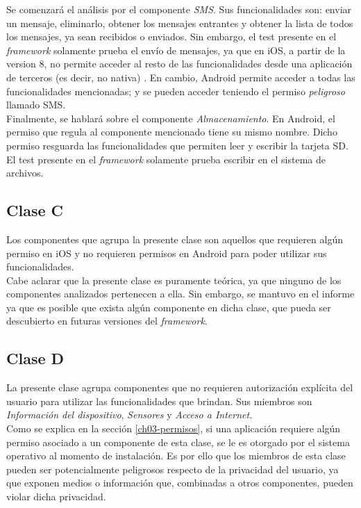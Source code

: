 Se comenzará el análisis por el componente \emph{SMS}. Sus funcionalidades son: enviar un mensaje, eliminarlo, obtener los mensajes entrantes y obtener la lista de todos los mensajes, ya sean recibidos o enviados. Sin embargo, el test presente en el \textit{framework} solamente prueba el envío de mensajes, ya que en iOS, a partir de la version 8, no permite acceder al resto de las funcionalidades desde una aplicación de terceros (es decir, no nativa) \cite{foda, foda2}. En cambio, Android permite acceder a todas las funcionalidades mencionadas; y se pueden acceder teniendo el permiso \textit{peligroso} llamado SMS.\\

Finalmente, se hablará sobre el componente \emph{Almacenamiento}. En Android, el permiso que regula al componente mencionado tiene su mismo nombre. Dicho permiso resguarda las funcionalidades que permiten leer y escribir la tarjeta SD. El test presente en el \textit{framework} solamente prueba escribir en el sistema de archivos.
\subsection{Clase C}
Los componentes que agrupa la presente clase son aquellos que requieren algún permiso en iOS y no requieren permisos en Android para poder utilizar sus funcionalidades.\\

Cabe aclarar que la presente clase es puramente teórica, ya que ninguno de los componentes analizados pertenecen a ella. Sin embargo, se mantuvo en el informe ya que es posible que exista algún componente en dicha clase, que pueda ser descubierto en futuras versiones del \textit{framework}.
\subsection{Clase D}
La presente clase agrupa componentes que no requieren autorización explícita del usuario para utilizar las funcionalidades que brindan. Sus miembros son \emph{Información del dispositivo}, \emph{Sensores} y \emph{Acceso a Internet}.\\

Como se explica en la sección \ref{ch03-permisos}, si una aplicación requiere algún permiso asociado a un componente de esta clase, se le es otorgado por el sistema operativo al momento de instalación. Es por ello que los miembros de esta clase pueden ser potencialmente peligrosos respecto de la privacidad del usuario, ya que exponen medios o información que, combinadas a otros componentes, pueden violar dicha privacidad.\\

